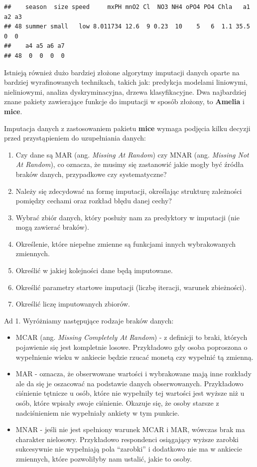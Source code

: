 \documentclass[]{book}
\providecommand{\tightlist}{%
  \setlength{\itemsep}{0pt}\setlength{\parskip}{0pt}}
\theoremstyle{plain}
\theoremstyle{definition}
\begin{document}
\begin{verbatim}
##    season  size speed     mxPH mnO2 Cl  NO3 NH4 oPO4 PO4 Chla   a1 a2 a3
## 48 summer small   low 8.011734 12.6  9 0.23  10    5   6  1.1 35.5  0  0
##    a4 a5 a6 a7
## 48  0  0  0  0
\end{verbatim}

Istnieją również dużo bardziej złożone algorytmy imputacji danych oparte na bardziej wyrafinowanych technikach, takich jak: predykcja modelami liniowymi, nieliniowymi, analiza dyskryminacyjna, drzewa klasyfikacyjne. Dwa najbardziej znane pakiety zawierające funkcje do imputacji w sposób złożony, to \textbf{Amelia} i \textbf{mice}.

Imputacja danych z zastosowaniem pakietu \textbf{mice} wymaga podjęcia kilku decyzji przed przystąpieniem do uzupełniania danych:

\begin{enumerate}
\def\labelenumi{\arabic{enumi}.}
\tightlist
\item
  Czy dane są MAR (ang. \emph{Missing At Random}) czy MNAR (ang. \emph{Missing Not At Random}), co oznacza, że musimy się zastanowić jakie mogły być źródła braków danych, przypadkowe czy systematyczne?
\item
  Należy się zdecydować na formę imputacji, określając strukturę zależności pomiędzy cechami oraz rozkład błędu danej cechy?
\item
  Wybrać zbiór danych, który posłuży nam za predyktory w imputacji (nie mogą zawierać braków).
\item
  Określenie, które niepełne zmienne są funkcjami innych wybrakowanych zmiennych.
\item
  Określić w jakiej kolejności dane będą imputowane.
\item
  Określić parametry startowe imputacji (liczbę iteracji, warunek zbieżności).
\item
  Określić liczę imputowanych zbiorów.
\end{enumerate}

Ad 1. Wyróżniamy następujące rodzaje braków danych:

\begin{itemize}
\tightlist
\item
  MCAR (ang. \emph{Missing Completely At Random}) - z definicji to braki, których pojawienie się jest kompletnie losowe. Przykładowo gdy osoba poproszona o wypełnienie wieku w ankiecie będzie rzucać monetą czy wypełnić tą zmienną.
\item
  MAR - oznacza, że obserwowane wartości i wybrakowane mają inne rozkłady ale da się je oszacować na podstawie danych obserwowanych. Przykładowo ciśnienie tętnicze u osób, które nie wypełniły tej wartości jest wyższe niż u osób, które wpisały swoje ciśnienie. Okazuje się, że osoby starsze z nadciśnieniem nie wypełniały ankiety w tym punkcie.
\item
  MNAR - jeśli nie jest spełniony warunek MCAR i MAR, wówczas brak ma charakter nielosowy. Przykładowo respondenci osiągający wyższe zarobki sukcesywnie nie wypełniają pola ``zarobki'' i dodatkowo nie ma w ankiecie zmiennych, które pozwoliłyby nam ustalić, jakie to osoby.
\end{itemize}
\end{document}
